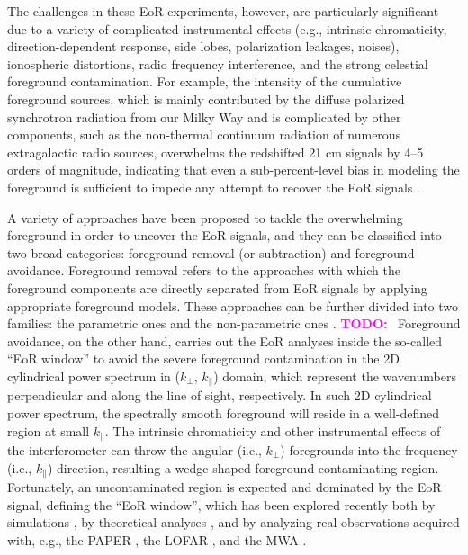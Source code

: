 \documentclass[modern]{aastex61}
\newcommand{\klos}{$k_{\parallel}$}
\newcommand{\kperp}{$k_{\bot}$}
\newcommand{\TODO}[1]{\textcolor{magenta}{\textbf{TODO:}}~\uuline{#1}}
\begin{document}
The challenges in these EoR experiments, however, are particularly
significant due to a variety of complicated instrumental effects
(e.g., intrinsic chromaticity, direction-dependent response, side lobes,
polarization leakages, noises), ionospheric distortions, radio frequency
interference, and the strong celestial foreground contamination.
For example, the intensity of the cumulative foreground sources, which
is mainly contributed by the diffuse polarized synchrotron radiation from
our Milky Way and is complicated by other components, such as the
non-thermal continuum radiation of numerous extragalactic radio sources,
overwhelms the redshifted 21 cm signals by \numrange{4}{5} orders of
magnitude, indicating that even a sub-percent-level bias in modeling
the foreground is sufficient to impede any attempt to recover the EoR
signals \citep[e.g.,][]{beardsley2016,murray2017,procopio2017}.

A variety of approaches have been proposed to tackle the overwhelming
foreground in order to uncover the EoR signals, and they can be classified
into two broad categories: foreground removal (or subtraction) and
foreground avoidance.
Foreground removal refers to the approaches with which the foreground
components are directly separated from EoR signals by applying appropriate
foreground models.
These approaches can be further divided into two families:
the parametric ones \citep[e.g.,][]{wang2006,jelic2008,liu2009,wang2013}
and the non-parametric ones
\citep[e.g.,][]{harker2009,wang2010,chapman2012,chapman2013,gu2013}.
\TODO{[needs improve]}
Foreground avoidance, on the other hand, carries out the EoR analyses
inside the so-called \enquote{EoR window} to avoid the severe foreground
contamination in the 2D cylindrical power spectrum in (\kperp, \klos)
domain, which represent the wavenumbers perpendicular and along the
line of sight, respectively.
In such 2D cylindrical power spectrum, the spectrally smooth foreground
will reside in a well-defined region at small \klos.
The intrinsic chromaticity and other instrumental effects of the
interferometer can throw the angular (i.e., \kperp) foregrounds into
the frequency (i.e., \klos) direction, resulting a wedge-shaped foreground
contaminating region.
Fortunately, an uncontaminated region is expected and dominated by the
EoR signal, defining the \enquote{EoR window}, which has been explored
recently both by simulations
\citep[e.g.,][]{datta2010,thyagarajan2013,thyagarajan2015,barry2016},
by theoretical analyses \citep[e.g.,][]{morales2012,hazelton2013,liu2014},
and by analyzing real observations acquired with, e.g.,
the PAPER \citep{pober2013,ali2015},
the LOFAR \citep{patil2017},
and the MWA \citep{dillon2015,beardsley2016,procopio2017}.
\end{document}

